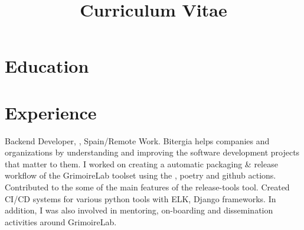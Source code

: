 \documentclass[11pt,a4paper,sans]{moderncv} %
\title{Curriculum Vitae}
\begin{document}
\makecvtitle %

\section{Education}









\section{Experience}

{
    Backend Developer, \textbf{}, Spain/Remote Work.
    \newline
    Bitergia helps companies and organizations by understanding and improving the software development projects that matter to them. I worked on creating a automatic packaging \& release workflow of the GrimoireLab toolset using the , poetry and github actions. Contributed to the some of the main features of the release-tools tool. Created CI/CD systems for various python tools with ELK, Django frameworks. In addition, I was also involved in mentoring, on-boarding and dissemination activities around GrimoireLab.
}
\end{document}
